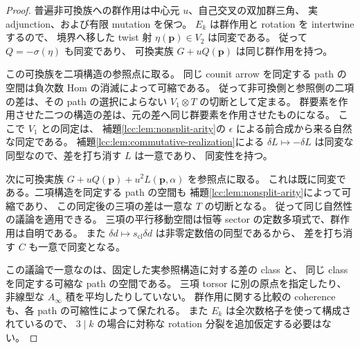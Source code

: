 \begin{proof}
普遍非可換族への群作用は中心元 $u$、自己交叉の双加群三角、
実 adjunction、および有限 mutation を保つ。
$E_k$ は群作用と rotation を intertwine するので、
境界へ移した twist 射 $\eta(\mathbf p)\in V_2$ は同変である。
従って $Q=-\sigma(\eta)$ も同変であり、
可換実族 $G+uQ(\mathbf p)$ は同じ群作用を持つ。

この可換族を二項構造の参照点に取る。
同じ counit arrow を同定する path の空間は負次数 Hom の消滅によって可縮である。
従って非可換側と参照側の二項の差は、その path の選択によらない
$V_1\otimes T$ の切断として定まる。
群要素を作用させた二つの構造の差は、元の差へ同じ群要素を作用させたものになる。
ここで $V_1$ との同定は、
補題\ref{lcc:lem:nonsplit-arity}の $\epsilon$ による前合成から来る自然な同定である。
補題\ref{lcc:lem:commutative-realization}による
$\delta L\mapsto-\delta L$ は同変な同型なので、差を打ち消す $L$ は一意であり、
同変性を持つ。

次に可換実族 $G+uQ(\mathbf p)+u^2L(\mathbf p,\alpha)$ を参照点に取る。
これは既に同変である。二項構造を同定する path の空間も
補題\ref{lcc:lem:nonsplit-arity}によって可縮であり、
この同定後の三項の差は一意な $T$ の切断となる。
従って同じ自然性の議論を適用できる。
三項の平行移動空間は恒等 sector の定数多項式で、群作用は自明である。
また $\delta d\mapsto s_{\mathrm{cl}}\delta d$ は非零定数倍の同型であるから、
差を打ち消す $C$ も一意で同変となる。

この議論で一意なのは、固定した実参照構造に対する差の class と、
同じ class を同定する可縮な path の空間である。
三項 torsor に別の原点を指定したり、非線型な $A_\infty$ 積を平均したりしていない。
群作用に関する比較の coherence も、各 path の可縮性によって保たれる。
また $E_k$ は全次数格子を使って構成されているので、
$3\mid k$ の場合に対称な rotation 分裂を追加仮定する必要はない。
\end{proof}

